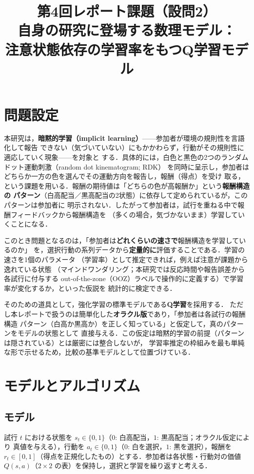 \documentclass[a4paper,11pt]{jsarticle}
\title{第4回レポート課題（設問2）\\
自身の研究に登場する数理モデル：\\
注意状態依存の学習率をもつQ学習モデル}
\author{}
\date{}
\begin{document}
\maketitle

\section{問題設定}

本研究は，\textbf{暗黙的学習（implicit learning）}——参加者が環境の規則性を言語化して報告
できない（気づいていない）にもかかわらず，行動がその規則性に適応していく現象——を対象と
する．具体的には，白色と黒色の2つのランダムドット運動刺激（random dot kinematogram; RDK）
を同時に呈示し，参加者はどちらか一方の色を選んでその運動方向を報告し，報酬（得点）を受け
取る，という課題を用いる．報酬の期待値は「どちらの色が高報酬か」という\textbf{報酬構造の
パターン}（白高配当／黒高配当の2状態）に依存して定められているが，このパターンは参加者に
明示されない．したがって参加者は，試行を重ねる中で報酬フィードバックから報酬構造を
（多くの場合，気づかないまま）学習していくことになる．

このとき問題となるのは，「参加者は\textbf{どれくらいの速さで}報酬構造を学習しているのか」
を，選択行動の系列データから\textbf{定量的に}評価することである．学習の速さを1個のパラメータ
（学習率）として推定できれば，例えば注意が課題から逸れている状態
（マインドワンダリング；本研究では反応時間や報告誤差から各試行に付与する
out-of-the-zone（OOZ）ラベルで操作的に定義する）で学習率が変化するか，といった仮説を
統計的に検定できる．

そのための道具として，強化学習の標準モデルである\textbf{Q学習}を採用する．
ただし本レポートで扱うのは簡単化した\textbf{オラクル版}であり，「参加者は各試行の報酬構造
パターン（白高か黒高か）を正しく知っている」と仮定して，真のパターンをモデルの状態として
直接与える．この仮定は暗黙的学習の前提（パターンは隠されている）とは厳密には整合しないが，
学習率推定の枠組みを最も単純な形で示せるため，比較の基準モデルとして位置づけている．

\section{モデルとアルゴリズム}

\subsection{モデル}

試行 $t$ における状態を $s_t \in \{0,1\}$（$0$: 白高配当，$1$: 黒高配当；オラクル仮定により
真値を与える），行動を $a_t \in \{0,1\}$（$0$: 白を選択，$1$: 黒を選択），報酬を
$r_t \in [0,1]$（得点を正規化したもの）とする．参加者は各状態・行動対の価値
$Q(s,a)$（$2\times2$ の表）を保持し，選択と学習を繰り返すと考える．
\end{document}
